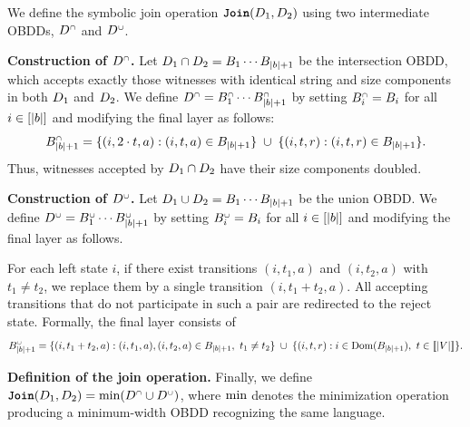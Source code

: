 We define the symbolic join operation
$\texttt{\textbf{Join}}(D_1,D_2)$ using two intermediate OBDDs,
$D^{{\scriptscriptstyle\cap}}$ and $D^{{\scriptscriptstyle\cup}}$.

\medskip
\noindent\textbf{Construction of $D^{{\scriptscriptstyle\cap}}$.}
Let $D_1 \cap D_2 = B_1 \cdots B_{|b|+1}$ be the intersection
OBDD, which accepts exactly those witnesses with identical string and size
components in both $D_1$ and $D_2$.
We define $D^{{\scriptscriptstyle\cap}} = B_1^{{\scriptscriptstyle\cap}} \cdots
B_{|b|+1}^{{\scriptscriptstyle\cap}}$ by setting
$B_i^{{\scriptscriptstyle\cap}} = B_i$ for all $i \in [|b|]$ and modifying the
final layer as follows:
\[
B_{|b|+1}^{{\scriptscriptstyle\cap}}
=
\{(i,2\cdot t,a) : (i,t,a) \in B_{|b|+1}\}
\;\cup\;
\{(i,t,r) : (i,t,r) \in B_{|b|+1}\}.
\]
Thus, witnesses accepted by $D_1 \cap D_2$ have their size components
doubled.

\medskip
\noindent\textbf{Construction of $D^{{\scriptscriptstyle\cup}}$.}
Let $D_1 \cup D_2 = B_1 \cdots B_{|b|+1}$ be the union OBDD.
We define $D^{{\scriptscriptstyle\cup}} = B_1^{{\scriptscriptstyle\cup}} \cdots
B_{|b|+1}^{{\scriptscriptstyle\cup}}$ by setting
$B_i^{{\scriptscriptstyle\cup}} = B_i$ for all $i \in [|b|]$ and modifying the
final layer as follows.

For each left state $i$, if there exist transitions $(i,t_1,a)$ and $(i,t_2,a)$
with $t_1 \neq t_2$, we replace them by a single transition
$(i,t_1+t_2,a)$. All accepting transitions that do not participate in such a
pair are redirected to the reject state. Formally, the final layer consists of
\[
\B_{|\activelabels|+1}^{\scriptcup}
=
\{(i,t_1+t_2,a) : (i,t_1,a),(i,t_2,a)\in \B_{|\activelabels|+1},\ t_1\neq t_2\}
\;\cup\;
\{(i,t,r) : i \in \Dom(\B_{|\activelabels|+1}),\ t \in \dbset{|V|}\}.
\]

\medskip
\noindent\textbf{Definition of the join operation.}
Finally, we define
$\texttt{\textbf{Join}}(D_1,D_2)
=
\mathrm{min}\!\left(D^{{\scriptscriptstyle\cap}} \cup D^{{\scriptscriptstyle\cup}}\right)$,
where $\mathrm{min}$ denotes the minimization operation producing a minimum-width
OBDD recognizing the same language.







